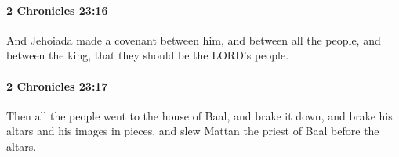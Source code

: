		\paragraph{2 Chronicles 23:16} %
			\label{2CHRONICLES-23-16}

			And Jehoiada made a covenant between him, and between all the people, and between the king, that they should be the LORD's people.


		\paragraph{2 Chronicles 23:17} %
			\label{2CHRONICLES-23-17}

			Then all the people went to the house of Baal, and brake it down, and brake his altars and his images in pieces, and slew Mattan the priest of Baal before the altars.



